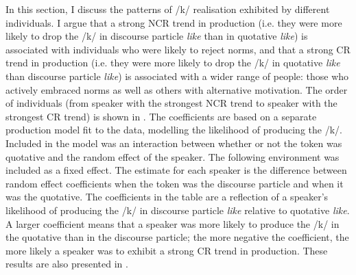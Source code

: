 In this section, I discuss the patterns of /k/ realisation exhibited by different individuals. I argue that a strong NCR trend in production (i.e. they were more likely to drop the /k/ in discourse particle \textit{like} than in quotative \textit{like}) is associated with individuals who were likely to reject norms, and that a strong CR trend in production (i.e. they were more likely to drop the /k/ in quotative \textit{like} than discourse particle \textit{like}) is associated with a wider range of people: those who actively embraced norms as well as others with alternative motivation. The order of individuals (from speaker with the strongest NCR trend to speaker with the strongest CR trend) is shown in . The coefficients are based on a separate production model fit to the data, modelling the likelihood of producing the /k/. Included in the model was an interaction between whether or not the token was quotative and the random effect of the speaker. The following environment was included as a fixed effect. The estimate for each speaker is the difference between random effect coefficients when the token was the discourse particle and when it was the quotative. The coefficients in the table are a reflection of a speaker's likelihood of producing the /k/ in discourse particle \textit{like} relative to quotative \textit{like}. A larger coefficient means that a speaker was more likely to produce the /k/ in the quotative than in the discourse particle; the more negative the coefficient, the more likely a speaker was to exhibit a strong CR trend in production. These results are also presented in \citet{dragerhay2012}.

